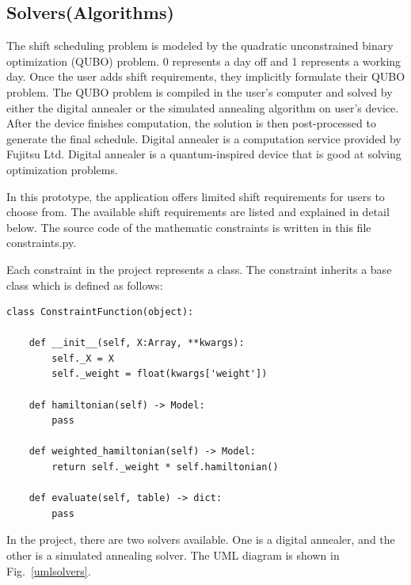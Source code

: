 \documentclass[11pt, oneside]{article}   	%
\begin{document}
\subsection{Solvers(Algorithms)}
The shift scheduling problem is modeled by the quadratic unconstrained binary optimization (QUBO) problem. 0 represents a day off and 1 represents a working day. Once the user adds shift requirements, they implicitly formulate their QUBO problem. The QUBO problem is compiled in the user's computer and solved by either the digital annealer or the simulated annealing algorithm on user's device. After the device finishes computation, the solution is then post-processed to generate the final schedule. Digital annealer is a computation service provided by Fujitsu Ltd. Digital annealer is a quantum-inspired device that is good at solving optimization problems.

In this prototype, the application offers limited shift requirements for users to choose from. The available shift requirements are listed and explained in detail below. The source code of the mathematic constraints is written in this file constraints.py.

Each constraint in the project represents a class. The constraint inherits a base class which is defined as follows:
\begin{verbatim}
class ConstraintFunction(object):
    
    def __init__(self, X:Array, **kwargs):
        self._X = X
        self._weight = float(kwargs['weight'])
        
    def hamiltonian(self) -> Model:
        pass

    def weighted_hamiltonian(self) -> Model:
        return self._weight * self.hamiltonian()
    
    def evaluate(self, table) -> dict:
        pass
\end{verbatim}

In the project, there are two solvers available. One is a digital annealer, and the other is a simulated annealing solver. The UML diagram is shown in Fig.~\ref{umlsolvers}.
\end{document}
